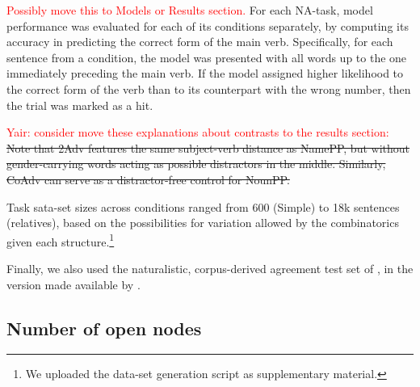 \textcolor{red}{Possibly move this to Models or Results section.} For
each NA-task, model performance was evaluated for each of its
conditions separately, by computing its accuracy in predicting the
correct form of the main verb. Specifically, for each sentence from a
condition, the model was presented with all words up to the one
immediately preceding the main verb. If the model assigned higher
likelihood to the correct form of the verb than to its counterpart
with the wrong number, then the trial was marked as a hit.

\textcolor{red}{Yair: consider move these explanations about contrasts to the results section:} \sout{Note that 2Adv features the same subject-verb
distance as NamePP, but without gender-carrying words acting as
possible distractors in the middle. Similarly, CoAdv can serve as a
distractor-free control for NounPP.}

Task sata-set sizes across conditions ranged from 600 (Simple) to 18k sentences (relatives),
based on the possibilities for variation allowed by the combinatorics
given each structure.\footnote{We uploaded the data-set generation
  script as supplementary material.}

Finally, we also used the naturalistic, corpus-derived agreement test set of , in the version made available by .

\subsection{Number of open nodes}





